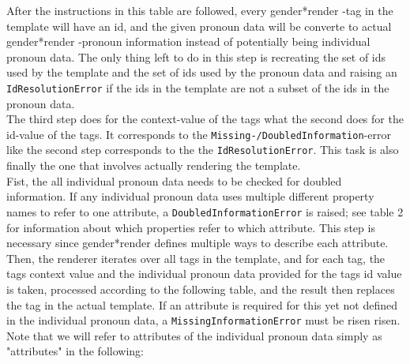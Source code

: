 \documentclass{article}
\newcommand{\GenderRender}{
    gender*render
}
\begin{document}
    After the instructions in this table are followed, every \GenderRender-tag in the template will have an id, and the given pronoun data will be converte to actual \GenderRender-pronoun information instead of potentially being individual pronoun data.
    The only thing left to do in this step is recreating the set of ids used by the template and the set of ids used by the pronoun data and raising an \texttt{IdResolutionError} if the ids in the template are not a subset of the ids in the pronoun data.\\

    The third step does for the context-value of the tags what the second does for the id-value of the tags.
    It corresponds to the \texttt{Missing-/DoubledInformation}-error like the second step corresponds to the the \texttt{IdResolutionError}.
    This task is also finally the one that involves actually rendering the template.\\

    Fist, the all individual pronoun data needs to be checked for doubled information.
    If any individual pronoun data uses multiple different property names to refer to one attribute, a \texttt{DoubledInformationError} is raised;
    see table 2 for information about which properties refer to which attribute.
    This step is necessary since \GenderRender defines multiple ways to describe each attribute.\\

    Then, the renderer iterates over all tags in the template, and for each tag, the tags context value and the individual pronoun data provided for the tags id value is taken, processed according to the following table, and the result then replaces the tag in the actual template.
    If an attribute is required for this yet not defined in the individual pronoun data, a \texttt{MissingInformationError} must be risen risen.
    Note that we will refer to attributes of the individual pronoun data simply as "attributes" in the following:
\end{document}
